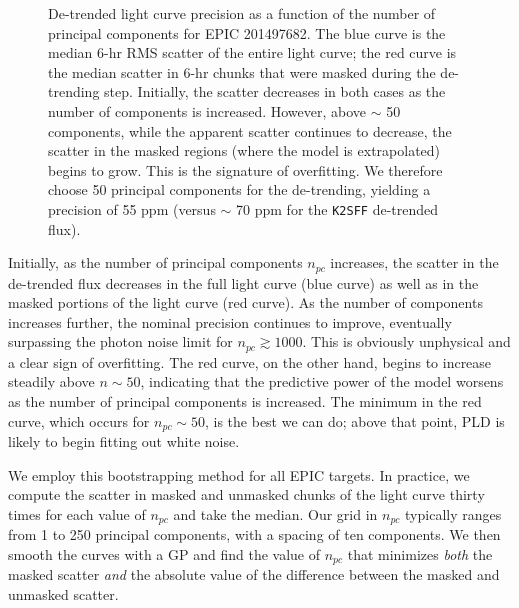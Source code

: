 \documentclass[]{emulateapj}
\begin{document}
\begin{figure}[h]
  \begin{center}
       \caption{De-trended light curve precision as a function of the number of principal
                components for EPIC 201497682. The blue curve is the median
                6-hr RMS scatter of the entire light curve; the red curve is the median 
                scatter in 6-hr chunks that were masked during the de-trending step.
                Initially, the scatter decreases in both cases as the 
                number of components is increased. However, above $\sim$ 50 components, while the apparent
                scatter continues to decrease, the scatter in the masked regions (where 
                the model is extrapolated) begins to grow. This is the signature
                of overfitting. We therefore choose 50 principal components for the
                de-trending, yielding a precision of 55 ppm (versus $\sim$ 70 ppm for the
                \texttt{K2SFF} de-trended flux).}
     \label{fig:scatter}
  \end{center}
\end{figure}

Initially, as the number of principal components $n_{pc}$ increases, the scatter in the de-trended flux
decreases in the full light curve (blue curve) as well as in the masked portions of the light curve
(red curve). As the number of components increases further, the nominal precision continues to improve,
eventually surpassing the photon noise limit for $n_{pc} \gtrsim 1000$. This is obviously unphysical and a
clear sign of overfitting. The red curve, on the other hand, begins to increase steadily above $n \sim 50$,
indicating that the predictive power of the model worsens as the number of principal components is increased.
The minimum in the red curve, which occurs for $n_{pc} \sim 50$, is the best we can do; above that point, PLD
is likely to begin fitting out white noise.

We employ this bootstrapping method for all EPIC targets. In practice, we compute the scatter in masked
and unmasked chunks of the light curve thirty times for each value of $n_{pc}$ and take the median. Our
grid in $n_{pc}$ typically ranges from 1 to 250 principal components, with a spacing of ten components.
We then smooth the curves with a GP and find the value of $n_{pc}$ that minimizes \emph{both} the masked scatter
\emph{and} the absolute value of the difference between the masked and unmasked scatter.
\end{document}
